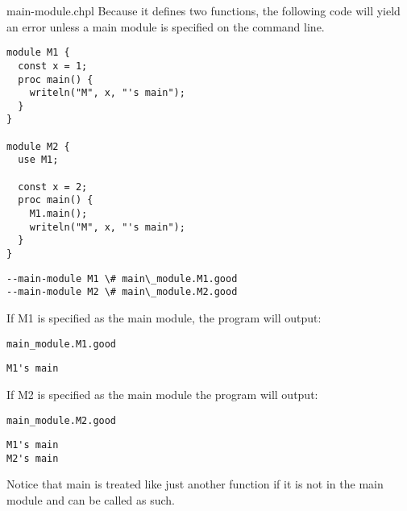\begin{chapelexample}{main-module.chpl}
Because it defines two  functions, the following code will yield an
error unless a main module is specified on the command line.
\begin{chapel}
\begin{verbatim}
module M1 {
  const x = 1;
  proc main() {
    writeln("M", x, "'s main");
  }
}
 
module M2 {
  use M1;

  const x = 2;
  proc main() {
    M1.main();
    writeln("M", x, "'s main");
  }
}
\end{verbatim}
\end{chapel}
\begin{chapelcompopts}
\begin{verbatim}
--main-module M1 \# main\_module.M1.good
--main-module M2 \# main\_module.M2.good
\end{verbatim}
\end{chapelcompopts}
If M1 is specified as the main module, the program will output:
\begin{chapeloutputname}
\begin{verbatim}
main_module.M1.good
\end{verbatim}
\end{chapeloutputname}
\begin{chapelprintoutput}
\begin{verbatim}
M1's main
\end{verbatim}
\end{chapelprintoutput}
If M2 is specified as the main module the program will output:
\begin{chapeloutputname}
\begin{verbatim}
main_module.M2.good
\end{verbatim}
\end{chapeloutputname}
\begin{chapelprintoutput}
\begin{verbatim}
M1's main
M2's main
\end{verbatim}
\end{chapelprintoutput}
Notice that main is treated like just another function if it is not in
the main module and can be called as such.
\end{chapelexample}



